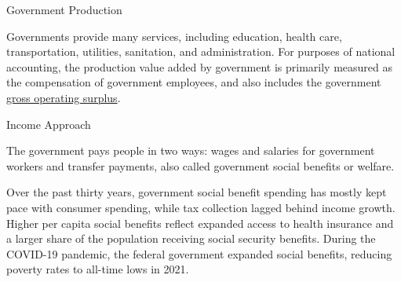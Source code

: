 \begin{minipage}{0.76\textwidth}
\normalsize Government Production
\vspace{-1mm}

\small Governments provide many services, including education, health care, transportation, utilities, sanitation, and administration. For purposes of national accounting, the production value added by government is primarily measured as the compensation of government employees, and also includes the government \href{https://www.bea.gov/help/glossary/gross-operating-surplus}{gross operating surplus}. 
\end{minipage}
\vspace{1mm}

\begin{minipage}{0.36\textwidth}
\vspace{3.0cm}

\hspace{5mm} 

\end{minipage} \hspace{5mm}
\begin{minipage}{0.36\textwidth}
\small 
\end{minipage}
\newpage
{}
\begin{minipage}{0.76\textwidth}    
\normalsize Income Approach
\vspace{-1mm}

\small The government pays people in two ways: wages and salaries for government workers and transfer payments, also called government social benefits or welfare.

Over the past thirty years, government social benefit spending has mostly kept pace with consumer spending, while tax collection lagged behind income growth. Higher per capita social benefits reflect expanded access to health insurance and a larger share of the population receiving social security benefits. During the COVID-19 pandemic, the federal government expanded social benefits, reducing poverty rates to all-time lows in 2021. 
\end{minipage}
\vspace{1mm}

